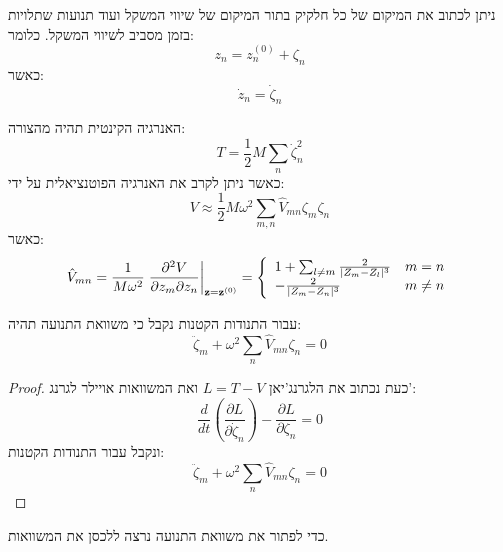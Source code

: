 \documentclass{tstextbook}
\begin{document}
\begin{proposition}
ניתן לכתוב את המיקום של כל חלקיק בתור המיקום של שיווי המשקל ועוד תנועות שתלויות בזמן מסביב לשיווי המשקל. כלומר:
$$z_{n}=z_{n}^{(0)}+\zeta_{n}$$
כאשר:
$$\dot{z}_{n}=\dot{\zeta}_{n}$$

\end{proposition}
\begin{proposition}
האנרגיה הקינטית תהיה מהצורה:
$$T=\frac{1}{2}M\sum_{n}\dot{\zeta}_{n}^{2}$$
כאשר ניתן לקרב את האנרגיה הפוטנציאלית על ידי:
$$V\approx\frac{1}{2}M\omega^{2}\sum_{m,n}\hat{V}_{m n}\zeta_{m}\zeta_{n}$$
כאשר:
$${\hat{V}}_{m n}={\frac{1}{M\omega^{2}}}\left.{\frac{\partial^{2}V}{\partial z_{m}\partial z_{n}}}\right|_{{\bf z}={\bf z}^{(0)}}=\left\{\begin{array}{l l}{{1+\sum_{l\neq m}{\frac{2}{|Z_{m}-Z_{l}|^{3}}}}}&{{m=n}}\\ {{-{\frac{2}{|Z_{m}-Z_{n}|^{3}}}}}&{{m\neq n}}\end{array}\right.$$

\end{proposition}
\begin{proposition}
עבור התנודות הקטנות נקבל כי משוואת התנועה תהיה:
$$\ddot{\zeta}_{m}+\omega^{2}\sum_{n}\hat{V}_{m n}\zeta_{n}=0$$

\end{proposition}
\begin{proof}
כעת נכתוב את הלגרנג'יאן \(L=T-V\) ואת המשוואות אויילר לגרנג':
$$\frac{d}{d t}\left(\frac{\partial L}{\partial\dot{\zeta}_{n}}\right)-\frac{\partial L}{\partial\zeta_{n}}=0$$
ונקבל עבור התנודות הקטנות:
$$\ddot{\zeta}_{m}+\omega^{2}\sum_{n}\hat{V}_{m n}\zeta_{n}=0$$

\end{proof}
כדי לפתור את משוואת התנועה נרצה ללכסן את המשוואות.
\end{document}
